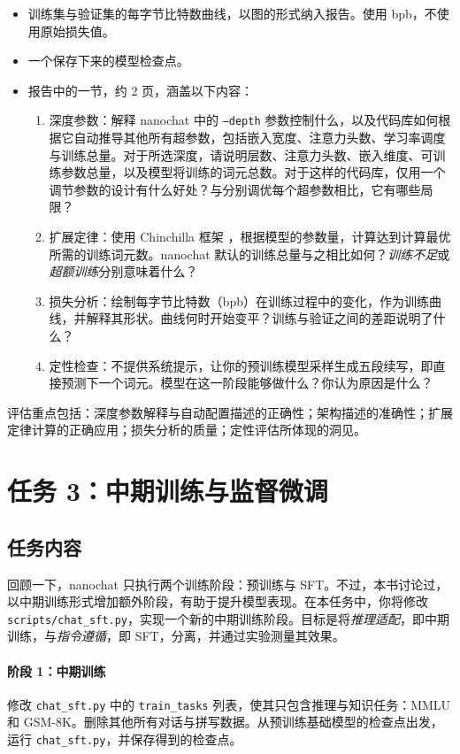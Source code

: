 \begin{itemize}
    \item 训练集与验证集的每字节比特数曲线，以图的形式纳入报告。使用 bpb，不使用原始损失值。
    \item 一个保存下来的模型检查点。
    \item 报告中的一节，约 2 页，涵盖以下内容：
          \begin{enumerate}
              \item 深度参数：解释 nanochat 中的 \texttt{--depth} 参数控制什么，以及代码库如何根据它自动推导其他所有超参数，包括嵌入宽度、注意力头数、学习率调度与训练总量。对于所选深度，请说明层数、注意力头数、嵌入维度、可训练参数总量，以及模型将训练的词元总数。对于这样的代码库，仅用一个调节参数的设计有什么好处？与分别调优每个超参数相比，它有哪些局限？
              \item 扩展定律：使用 Chinchilla 框架 \citep{10.5555/3600270.3602446}，根据模型的参数量，计算达到计算最优所需的训练词元数。nanochat 默认的训练总量与之相比如何？{\em 训练不足}或{\em 超额训练}分别意味着什么？
              \item 损失分析：绘制每字节比特数（bpb）在训练过程中的变化，作为训练曲线，并解释其形状。曲线何时开始变平？训练与验证之间的差距说明了什么？
              \item 定性检查：不提供系统提示，让你的预训练模型采样生成五段续写，即直接预测下一个词元。模型在这一阶段能够做什么？你认为原因是什么？
          \end{enumerate}
\end{itemize}
评估重点包括：深度参数解释与自动配置描述的正确性；架构描述的准确性；扩展定律计算的正确应用；损失分析的质量；定性评估所体现的洞见。

\section{任务 3：中期训练与监督微调}
\label{sec:task3}

\subsection{任务内容}

回顾一下，nanochat 只执行两个训练阶段：预训练与 SFT。不过，本书讨论过，以中期训练形式增加额外阶段，有助于提升模型表现。在本任务中，你将修改 \texttt{scripts/chat\_sft.py}，实现一个新的中期训练阶段。目标是将\emph{推理适配}，即中期训练，与\emph{指令遵循}，即 SFT，分离，并通过实验测量其效果。

\paragraph{阶段 1：中期训练}
修改 \texttt{chat\_sft.py} 中的 \texttt{train\_tasks} 列表，使其只包含推理与知识任务：MMLU 和 GSM-8K。删除其他所有对话与拼写数据。从预训练基础模型的检查点出发，运行 \texttt{chat\_sft.py}，并保存得到的检查点。

